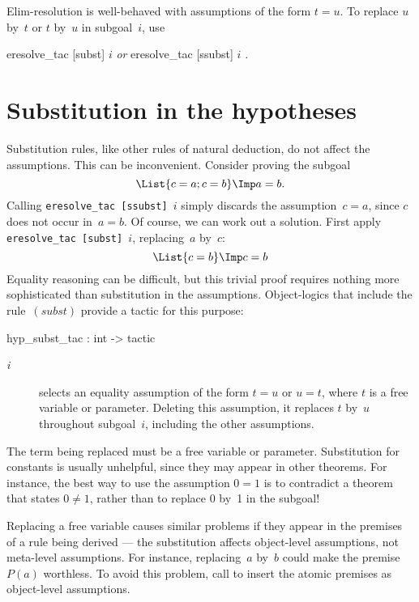 Elim-resolution is well-behaved with assumptions of the form $t=u$.
To replace $u$ by~$t$ or $t$ by~$u$ in subgoal~$i$, use
\begin{ttbox} 
eresolve_tac [subst] \(i\)    {\it or}    eresolve_tac [ssubst] \(i\) {\it.}
\end{ttbox}


\section{Substitution in the hypotheses}
Substitution rules, like other rules of natural deduction, do not affect
the assumptions.  This can be inconvenient.  Consider proving the subgoal
\[ \List{c=a; c=b} \Imp a=b. \]
Calling \hbox{\tt eresolve_tac [ssubst] \(i\)} simply discards the
assumption~$c=a$, since $c$ does not occur in~$a=b$.  Of course, we can
work out a solution.  First apply \hbox{\tt eresolve_tac [subst] \(i\)},
replacing~$a$ by~$c$:
\[ \List{c=b} \Imp c=b \]
Equality reasoning can be difficult, but this trivial proof requires
nothing more sophisticated than substitution in the assumptions.
Object-logics that include the rule~$(subst)$ provide a tactic for this
purpose:
\begin{ttbox} 
hyp_subst_tac : int -> tactic
\end{ttbox}
\begin{description}
\item[ {\it i}] 
selects an equality assumption of the form $t=u$ or $u=t$, where $t$ is a
free variable or parameter.  Deleting this assumption, it replaces $t$
by~$u$ throughout subgoal~$i$, including the other assumptions.
\end{description}
The term being replaced must be a free variable or parameter.  Substitution
for constants is usually unhelpful, since they may appear in other
theorems.  For instance, the best way to use the assumption $0=1$ is to
contradict a theorem that states $0\not=1$, rather than to replace 0 by~1
in the subgoal!

Replacing a free variable causes similar problems if they appear in the
premises of a rule being derived --- the substitution affects object-level
assumptions, not meta-level assumptions.  For instance, replacing~$a$
by~$b$ could make the premise~$P(a)$ worthless.  To avoid this problem, call
 to insert the atomic premises as object-level
assumptions.


